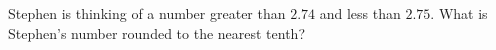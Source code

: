 Stephen is thinking of a number greater than $2.74$ and less than $2.75$. What is Stephen's number rounded to the nearest tenth?
